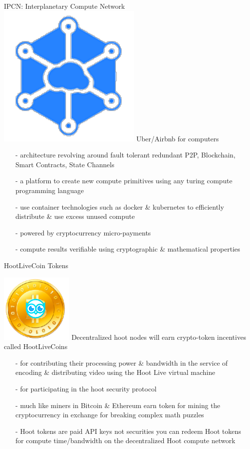 \documentclass[10pt]{beamer}
\begin{document}
\begin{frame}[t]{IPCN: Interplanetary Compute Network}
	\includegraphics[scale=.3]{static/ipcn-p2p} Uber/Airbnb for computers
 \begin{itemize}
  \item[-]architecture revolving around fault tolerant redundant P2P, Blockchain, Smart Contracts, State Channels
  \item[-]a platform to create new compute primitives using any turing compute programming language
  \item[-]use container technologies such as docker \& kubernetes to efficiently distribute \& use excess unused compute
  \item[-]powered by cryptocurrency micro-payments
  \item[-]compute results verifiable using cryptographic \& mathematical properties
 \end{itemize}
\end{frame}

\begin{frame}[t]{ HootLiveCoin Tokens }
 
 
\includegraphics[scale=0.4]{static/hootcoin}  Decentralized hoot nodes will earn crypto-token incentives called HootLiveCoins 
 

 \begin{itemize}
 \item[-]for contributing their processing power \& bandwidth in the service of encoding \& distributing video using the Hoot Live virtual machine 
 \item[-]for participating in the hoot security protocol
 \item[-]much like miners in Bitcoin \& Ethereum earn token for mining the cryptocurrency in exchange for breaking complex math puzzles
 \item[-]Hoot tokens are paid API keys not securities you can redeem Hoot tokens for compute time/bandwidth on the decentralized Hoot compute network
 \end{itemize}
 
 
 
\end{frame}
\end{document}
